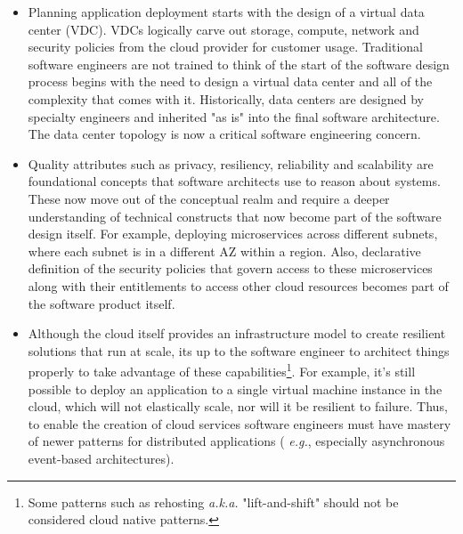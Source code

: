 \documentclass[conference]{IEEEtran}
\begin{document}
\begin{itemize}
	\item  Planning application deployment starts with the design of a virtual data center (VDC). VDCs logically carve out storage, compute, network and security policies from the cloud provider for customer usage. Traditional software engineers are not trained to think of the start of the software design process begins with the need to design a virtual data center and all of the complexity that comes with it.  Historically, data centers are designed by specialty engineers and inherited "as is" into the final software architecture. The data center topology is now a critical software engineering concern. 
	
	\item  Quality attributes such as privacy, resiliency, reliability and scalability are foundational concepts that software architects use to reason about systems.  These now move out of the conceptual realm and require a deeper understanding of technical constructs that now become part of the software design itself.  For example, deploying microservices across different subnets, where each subnet is in a different AZ within a region. Also, declarative definition of  the security policies that govern access to these microservices along with their entitlements to access other cloud resources becomes part of the software product itself. 
	
	\item  Although the cloud itself provides an infrastructure model to create resilient solutions that run at scale, its up to the software engineer to architect things properly to take advantage of these capabilities\footnote{Some patterns such as rehosting\cite{engelsrud2019moving} {\em a.k.a.} "lift-and-shift" should not be considered cloud native patterns.}.  For example, it's still possible to deploy an application to a single virtual machine instance in the cloud, which will not elastically scale, nor will it be resilient to failure.  Thus, to enable the creation of cloud services software engineers must have mastery of newer patterns for distributed applications ( {\em e.g.}, especially asynchronous event-based architectures).
	

\end{itemize}
\end{document}
